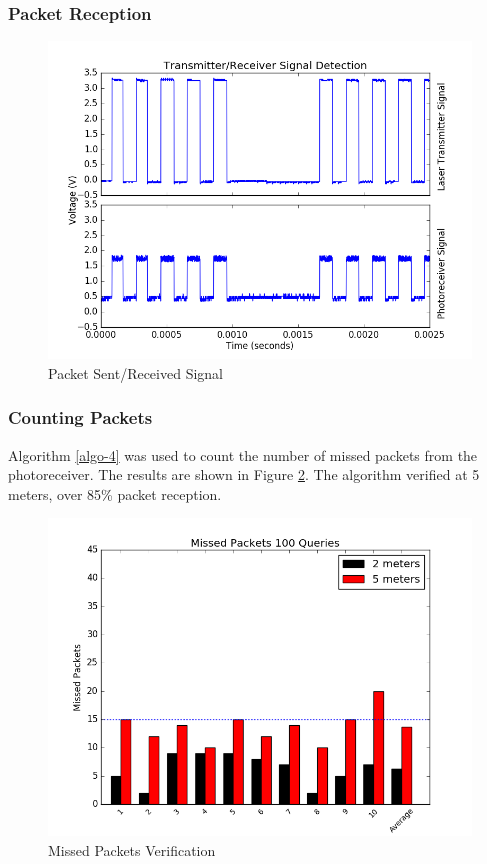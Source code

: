\documentclass[letterpaper,10pt]{article}
\begin{document}
\begin{spacing}{1.15}
\subsubsection{Packet Reception}
\begin{figure} [H]
	\centering
	\includegraphics[scale=0.45]{packet_verification.png}
	\caption{Packet Sent/Received Signal\label{fig:packet-verification}}
\end{figure}

\subsubsection {Counting Packets}
Algorithm \ref{algo-4} was used to count the number of missed packets from the photoreceiver.
The results are shown in Figure \ref{fig:transmitted-received}. The algorithm verified at 5 meters, over 85\% packet reception.

\begin{figure} [H]
	\centering
	\includegraphics[scale=0.45]{transmitted_received.png}
	\caption{Missed Packets Verification\label{fig:transmitted-received}}
\end{figure}


\end{spacing}
\end{document}
